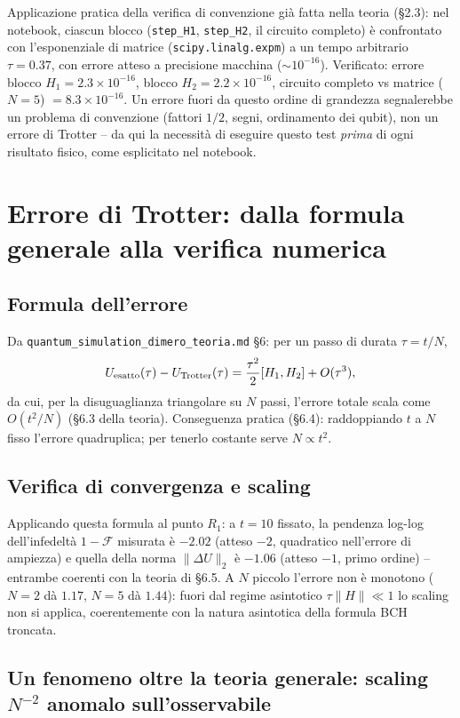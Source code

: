 \documentclass[11pt,a4paper]{article}
\begin{document}
Applicazione pratica della verifica di convenzione già fatta nella teoria
(\S2.3): nel notebook, ciascun blocco (\texttt{step\_H1}, \texttt{step\_H2},
il circuito completo) è confrontato con l'esponenziale di matrice
(\texttt{scipy.linalg.expm}) a un tempo arbitrario $\tau=0.37$, con errore
atteso a precisione macchina ($\sim10^{-16}$). Verificato: errore blocco
$H_1=2.3\times10^{-16}$, blocco $H_2=2.2\times10^{-16}$, circuito completo
vs matrice ($N=5$) $=8.3\times10^{-16}$. Un errore fuori da questo ordine di
grandezza segnalerebbe un problema di convenzione (fattori $1/2$, segni,
ordinamento dei qubit), non un errore di Trotter -- da qui la necessità di
eseguire questo test \emph{prima} di ogni risultato fisico, come esplicitato
nel notebook.

\section{Errore di Trotter: dalla formula generale alla verifica numerica}

\subsection{Formula dell'errore}

Da \texttt{quantum\_simulation\_dimero\_teoria.md} \S6: per un passo di
durata $\tau=t/N$,
$$U_{\rm esatto}(\tau)-U_{\rm Trotter}(\tau) = \frac{\tau^2}{2}[H_1,H_2]+O(\tau^3),$$
da cui, per la disuguaglianza triangolare su $N$ passi, l'errore totale
scala come $O(t^2/N)$ (\S6.3 della teoria). Conseguenza pratica (\S6.4):
raddoppiando $t$ a $N$ fisso l'errore quadruplica; per tenerlo costante
serve $N\propto t^2$.

\subsection{Verifica di convergenza e scaling}

Applicando questa formula al punto $R_1$: a $t=10$ fissato, la pendenza
log-log dell'infedeltà $1-\mathcal F$ misurata è $-2.02$ (atteso $-2$,
quadratico nell'errore di ampiezza) e quella della norma $\|\Delta U\|_2$ è
$-1.06$ (atteso $-1$, primo ordine) -- entrambe coerenti con la teoria di
\S6.5. A $N$ piccolo l'errore non è monotono ($N=2$ dà $1.17$, $N=5$ dà
$1.44$): fuori dal regime asintotico $\tau\|H\|\ll1$ lo scaling non si
applica, coerentemente con la natura asintotica della formula BCH troncata.

\subsection{Un fenomeno oltre la teoria generale: scaling $N^{-2}$ anomalo sull'osservabile}
\end{document}
